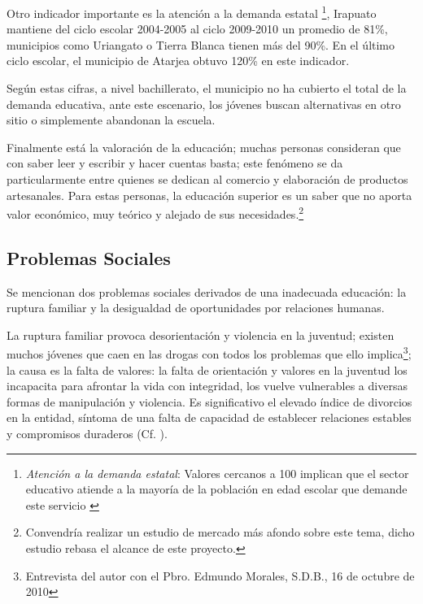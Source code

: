 





Otro indicador importante es la atención a la demanda estatal \footnote{\emph{Atención a la demanda estatal}: Valores cercanos a 100 implican que el sector educativo atiende a la mayoría de la población en edad escolar que demande este servicio \citep{Seg2010}}, Irapuato mantiene del ciclo escolar 2004-2005 al ciclo 2009-2010 un promedio de 81\%, municipios como Uriangato o Tierra Blanca tienen más del 90\%. En el último ciclo escolar, el municipio de Atarjea obtuvo 120\% en este indicador.

Según estas cifras, a nivel bachillerato, el municipio no ha cubierto el total de la demanda educativa, ante este escenario, los jóvenes buscan alternativas en otro sitio o simplemente abandonan la escuela.

Finalmente está la valoración de la educación; muchas personas consideran que con saber leer y escribir y hacer cuentas basta; este fenómeno se da particularmente entre quienes se dedican al comercio y elaboración de productos artesanales. Para estas personas, la educación superior es un saber que no aporta valor económico, muy teórico y alejado de sus necesidades.\footnote{Convendría realizar un estudio de mercado más afondo sobre este tema, dicho estudio rebasa el alcance de este proyecto.}



\subsection{Problemas Sociales}

Se mencionan dos problemas sociales derivados de una inadecuada educación: la ruptura familiar y la desigualdad de oportunidades por relaciones humanas.

La ruptura familiar provoca desorientación y violencia en la juventud; existen muchos j\'ovenes que caen en las drogas con todos los problemas que ello implica\footnote{Entrevista del autor con el Pbro. Edmundo Morales, S.D.B., 16 de octubre de 2010}; la causa es la falta de valores: la falta de orientación y valores en la juventud los incapacita para afrontar la vida con integridad, los vuelve vulnerables a diversas formas de manipulación y violencia. Es significativo el elevado índice de divorcios en la entidad, síntoma de una falta de capacidad de establecer relaciones estables y compromisos duraderos (Cf. \citep{Morales09}).

